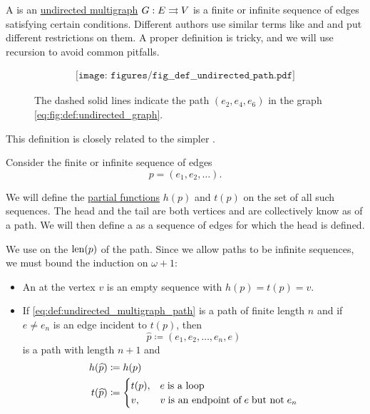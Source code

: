 \begin{definition}\label{def:undirected_multigraph_path}
  A  is an \hyperref[def:undirected_graph]{undirected multigraph} \( G: E \rightrightarrows V \) is a finite or infinite sequence of edges satisfying certain conditions. Different authors use similar terms like  and  and put different restrictions on them. A proper definition is tricky, and we will use recursion to avoid common pitfalls.

  \begin{figure}
    \begin{equation}\label{eq:fig:def:undirected_path}
      \begin{aligned}
        \texttt{[image: figures/fig\_\_def\_\_undirected\_path.pdf]}
      \end{aligned}
    \end{equation}
    \caption{The dashed solid lines indicate the path \( (e_2, e_4, e_6) \) in the graph \eqref{eq:fig:def:undirected_graph}.}\label{fig:def:undirected_path}
  \end{figure}

  This definition is closely related to the simpler .

  Consider the finite or infinite sequence of edges
  \begin{equation}\label{eq:def:undirected_multigraph_path}
    p = (e_1, e_2, \ldots).
  \end{equation}

  We will define the \hyperref[def:partial_function]{partial functions}  \( h(p) \) and  \( t(p) \) on the set of all such sequences. The head and the tail are both vertices and are collectively know as  of a path. We will then define a  as a sequence of edges for which the head is defined.

  We use  on the  \( \operatorname{len}(p) \) of the path. Since we allow paths to be infinite sequences, we must bound the induction on \( \omega + 1 \):
  \begin{itemize}
    \item An  at the vertex \( v \) is an empty sequence with \( h(p) = t(p) = v \).

    \item If \eqref{eq:def:undirected_multigraph_path} is a path of finite length \( n \) and if \( e \neq e_n \) is an edge incident to \( t(p) \), then
    \begin{equation*}
      \widehat{p} \coloneqq (e_1, e_2, \ldots, e_n, e)
    \end{equation*}
    is a path with length \( n + 1 \) and
    \begin{align*}
      h(\widehat{p}) &\coloneqq h(p) \\
      t(\widehat{p}) &\coloneqq \begin{cases}
        t(p), &e \T{is a loop} \\
        v,    &v \T{is an endpoint of} e \T{but not} e_n
      \end{cases}
    \end{align*}


\end{itemize}
\end{definition}
